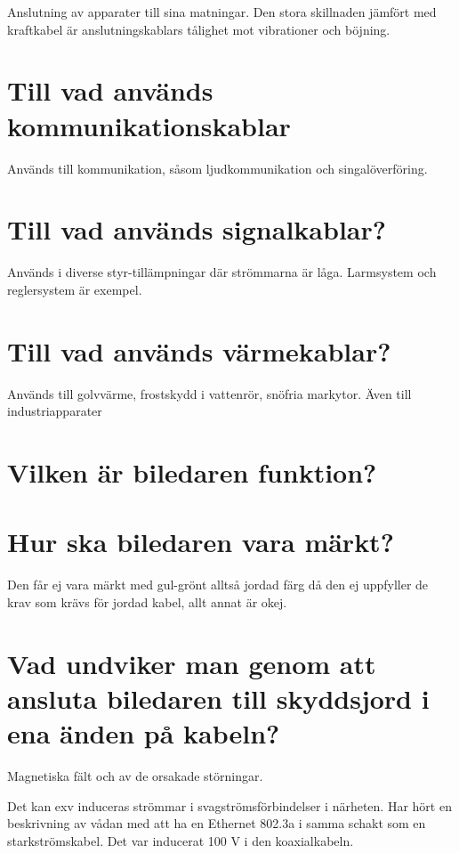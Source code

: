 \documentclass[a4paper,swedish]{article}
\begin{document}
Anslutning av apparater till sina matningar. Den stora skillnaden jämfört med kraftkabel är anslutningskablars
tålighet mot vibrationer och böjning.

\section{Till vad används kommunikationskablar}
\label{sec:q_m_26}

Används till kommunikation, såsom ljudkommunikation och singalöverföring.

\section{Till vad används signalkablar?}

Används i diverse styr-tillämpningar där strömmarna är låga.
Larmsystem och reglersystem är exempel.

\section{Till vad används värmekablar?}
\label{sec:q_m_28}

Används till golvvärme, frostskydd i vattenrör, snöfria markytor. Även till industriapparater

\section{Vilken är biledaren funktion?}

\section{Hur ska biledaren vara märkt?}
\label{sec:q_m_30}

Den får ej vara märkt med gul-grönt alltså jordad färg då den ej uppfyller de krav som krävs för jordad kabel, allt annat är okej.

\section{Vad undviker man genom att ansluta biledaren till skyddsjord i ena änden på
kabeln?}

Magnetiska fält och av de orsakade störningar.

Det kan exv induceras strömmar i svagströmsförbindelser i närheten.
Har hört en beskrivning av vådan med att ha en Ethernet 802.3a i samma schakt som
en starkströmskabel. Det var inducerat 100 V i den koaxialkabeln.
\end{document}
